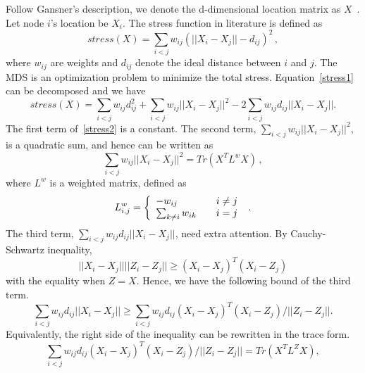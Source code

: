 
\appendix %
\chapter{}
Follow Gansner's description, we denote the d-dimensional location matrix as $X$~\cite{Gansner:05}. Let node $i$'s location be $X_{i}$. The stress function in literature is defined as
\begin{equation}\label{stress1}
stress(X)=\sum_{i<j} w_{ij} (||X_{i}-X_{j}|| - d_{ij})^{2}\,,
\end{equation}
where $w_{ij}$ are weights and $d_{ij}$ denote the ideal distance between $i$ and $j$. The MDS is an optimization problem to minimize the total stress. Equation~\ref{stress1} can be decomposed and we have
\begin{equation}\label{stress2}
stress(X)=\sum_{i<j} w_{ij}d_{ij}^{2} + \sum_{i<j}w_{ij}||X_{i}-X_{j}||^{2}- 2\sum_{i<j}w_{ij}d_{ij}||X_{i}-X_{j}||.
\end{equation}
The first term of~\ref{stress2} is a constant. The second term, $\sum_{i<j}w_{ij}||X_{i}-X_{j}||^{2}$, is a quadratic sum, and hence can be written as
\[ \sum_{i<j}w_{ij}||X_{i}-X_{j}||^{2} = Tr(X^{T}L^{w}X)\,, \]
where $L^{w}$ is a weighted matrix, defined as
\[
  L_{i,j}^{w}=\left\{ 
  \begin{array}{l l}
    -w_{ij} \quad & i \neq j\\
    \sum_{k \neq i}w_{ik} \quad &i=j 
  \end{array} \right. \text{ .}
\]
The third term, $\sum_{i<j}w_{ij}d_{ij}||X_{i}-X_{j}||$, need extra attention. By Cauchy-Schwartz inequality, 
\[
||X_{i}-X_{j}|| ||Z_{i}-Z_{j}|| \geq (X_{i}-X_{j})^{T} (X_{i} - Z_{j})
\]
with the equality when $Z=X$. Hence, we have the following bound of the third term.
\[
\sum_{i<j}w_{ij}d_{ij}||X_{i}-X_{j}|| \geq \sum_{i<j}w_{ij}d_{ij} (X_{i}-X_{j})^{T} (X_{i} - Z_{j}) / ||Z_{i}-Z_{j}||.
\]
Equivalently, the right side of the inequality can be rewritten in the trace form.
\[
\sum_{i<j}w_{ij}d_{ij} (X_{i}-X_{j})^{T} (X_{i} - Z_{j}) / ||Z_{i}-Z_{j}||=Tr(X^{T}L^{Z}X),
\]
